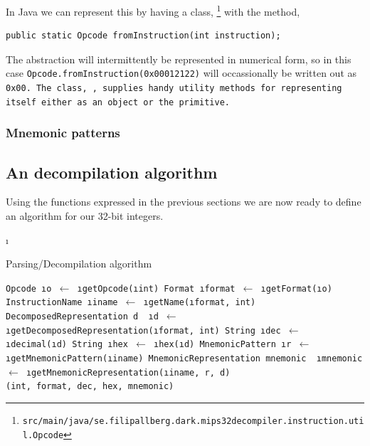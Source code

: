 In Java we can represent this by having a class, \opcodem\footnote{
\tt{src/main/java/se.filipallberg.dark.mips32decompiler.instruction.util.Opcode}}
with the method,

\begin{verbatim}
public static Opcode fromInstruction(int instruction);
\end{verbatim}

The \opcodem abstraction will intermittently be represented in
numerical form, so in this
case \texttt{Opcode.fromInstruction(0x00012122)} will
occassionally be written out as \tt{0x00}. The class, \opcodem,
supplies handy utility methods for representing itself either as an
object or the  primitive.


\subsubsection{Mnemonic patterns}


\subsection{An decompilation algorithm}

Using the functions expressed in the previous sections we are now ready to
define an algorithm for our 32-bit integers.

\LetLtxMacro\i\textit
\newcommand{\get}[2]{\tt{#1} \i{#2} $\gets$ }
\newcommand{\of}[1]{(\i{#1})}
\newcommand{\from}[1]{\i{#1}}

\begin{algorithm}
\caption{Parsing/Decompilation algorithm}\label{algo:decompile}
\begin{algorithmic}[1]
\State \get{Opcode}{o}\from{getOpcode}\of{int}
\State \get{Format}{format}\from{getFormat}\of{o}
\State \get{InstructionName}{iname}\from{getName}\of{format, int}
\State \tt{DecomposedRepresentation} d
\State \get{}{d}\from{getDecomposedRepresentation}\of{format, int}
\State \get{String}{dec}\from{decimal}\of{d}
\State \get{String}{hex}\from{hex}\of{d}
\State \get{MnemonicPattern}{r}\from{getMnemonicPattern}\of{iname}
\State \tt{MnemonicRepresentation} mnemonic
\State \get{}{mnemonic}\from{getMnemonicRepresentation}\of{iname, r, d} \\
\Return (int, format, dec, hex, mnemonic)
\EndProcedure
\end{algorithmic}
\end{algorithm}



